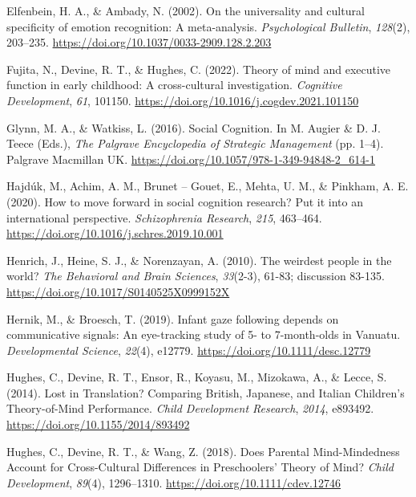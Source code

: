\documentclass[
  man,mask,floatsintext]{apa7}
\newlength{\cslhangindent}
\newlength{\cslentryspacingunit} %
\newenvironment{CSLReferences}[2] %
 {%
  \setlength{\parindent}{0pt}
  \ifodd #1
  \let\oldpar\par
  \def\par{\hangindent=\cslhangindent\oldpar}
  \fi
  \setlength{\parskip}{#2\cslentryspacingunit}
 }%
 {}
\begin{document}
\begin{CSLReferences}{1}{0}
\leavevmode{}%
Elfenbein, H. A., \& Ambady, N. (2002). On the universality and cultural specificity of emotion recognition: {A} meta-analysis. \emph{Psychological Bulletin}, \emph{128}(2), 203--235. \url{https://doi.org/10.1037/0033-2909.128.2.203}

\leavevmode{}%
Fujita, N., Devine, R. T., \& Hughes, C. (2022). Theory of mind and executive function in early childhood: {A} cross-cultural investigation. \emph{Cognitive Development}, \emph{61}, 101150. \url{https://doi.org/10.1016/j.cogdev.2021.101150}

\leavevmode{}%
Glynn, M. A., \& Watkiss, L. (2016). Social {Cognition}. In M. Augier \& D. J. Teece (Eds.), \emph{The {Palgrave Encyclopedia} of {Strategic Management}} (pp. 1--4). Palgrave Macmillan UK. \url{https://doi.org/10.1057/978-1-349-94848-2_614-1}

\leavevmode{}%
Hajdúk, M., Achim, A. M., Brunet -- Gouet, E., Mehta, U. M., \& Pinkham, A. E. (2020). How to move forward in social cognition research? {Put} it into an international perspective. \emph{Schizophrenia Research}, \emph{215}, 463--464. \url{https://doi.org/10.1016/j.schres.2019.10.001}

\leavevmode{}%
Henrich, J., Heine, S. J., \& Norenzayan, A. (2010). The weirdest people in the world? \emph{The Behavioral and Brain Sciences}, \emph{33}(2-3), 61-83; discussion 83-135. \url{https://doi.org/10.1017/S0140525X0999152X}

\leavevmode{}%
Hernik, M., \& Broesch, T. (2019). Infant gaze following depends on communicative signals: {An} eye-tracking study of 5- to 7-month-olds in {Vanuatu}. \emph{Developmental Science}, \emph{22}(4), e12779. \url{https://doi.org/10.1111/desc.12779}

\leavevmode{}%
Hughes, C., Devine, R. T., Ensor, R., Koyasu, M., Mizokawa, A., \& Lecce, S. (2014). Lost in {Translation}? {Comparing British}, {Japanese}, and {Italian Children}'s {Theory-of-Mind Performance}. \emph{Child Development Research}, \emph{2014}, e893492. \url{https://doi.org/10.1155/2014/893492}

\leavevmode{}%
Hughes, C., Devine, R. T., \& Wang, Z. (2018). Does {Parental Mind-Mindedness Account} for {Cross-Cultural Differences} in {Preschoolers}' {Theory} of {Mind}? \emph{Child Development}, \emph{89}(4), 1296--1310. \url{https://doi.org/10.1111/cdev.12746}


\end{CSLReferences}
\end{document}

